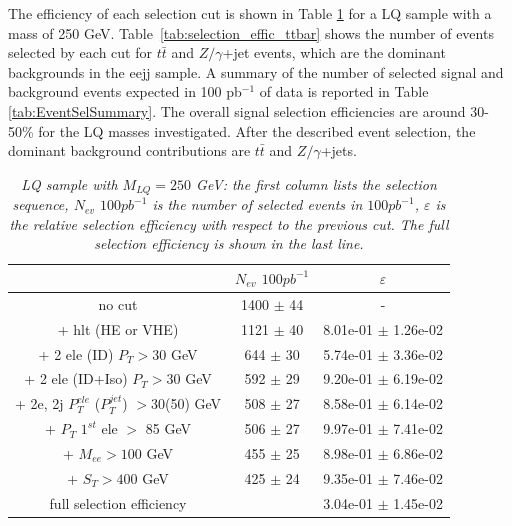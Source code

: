 \documentclass{cmspaper}
\begin{document}
\begin{linenumbers}
The efficiency of each selection cut is shown in Table \ref{tab:selection_effic_250} 
for a LQ sample with a mass of 250 GeV.  
Table~\ref{tab:selection_effic_ttbar} shows the number of events selected by each cut 
for $t\bar{t}$ and $Z/\gamma$+jet events, which are the dominant backgrounds in the eejj sample. 
A summary of the number of selected signal and background events expected in 100 pb$^{-1}$ of data 
is reported in Table \ref{tab:EventSelSummary}. 
The overall signal selection efficiencies 
are around 30-50\% for the LQ masses investigated. 
After the described event selection, the dominant background 
contributions are $t\bar{t}$ and $Z/\gamma$+jets. 

\begin{table}[htbp]
\begin{center}
\begin{tabular}{|c|c|c|}
\hline
\hline
 & $N_{ev}$ $100pb^{-1}$ & $\varepsilon$ \\
\hline
\hline

no cut &1400 $\pm$ 44& - \\
+ hlt (HE or VHE) &1121 $\pm$ 40 & 8.01e-01 $\pm$ 1.26e-02\\
+ 2 ele (ID) $P_{T} >30$ GeV &644 $\pm$ 30 & 5.74e-01 $\pm$ 3.36e-02\\
+ 2 ele (ID+Iso) $P_{T} >30$ GeV &592 $\pm$ 29 & 9.20e-01 $\pm$ 6.19e-02\\
+ 2e, 2j $P_{T}^{ele}$ ($P_{T}^{jet}$) $>$30(50) GeV &508 $\pm$ 27& 8.58e-01 $\pm$ 6.14e-02\\
+ $P_{T}$ $1^{st}$ ele $>$ 85 GeV &506 $\pm$ 27& 9.97e-01 $\pm$ 7.41e-02\\
+ $M_{ee} >100$ GeV& 455 $\pm$ 25& 8.98e-01 $\pm$ 6.86e-02\\
+ $S_{T} >400$ GeV &425 $\pm$ 24& 9.35e-01 $\pm$ 7.46e-02\\
\hline

full selection efficiency& & 3.04e-01 $\pm$ 1.45e-02\\
\hline
\end{tabular}
\end{center}
\caption{\small \sl LQ sample with $M_{LQ}=250$ GeV: the first column lists the selection sequence, $N_{ev}$ $100pb^{-1}$ is the number of selected events in $100pb^{-1}$, $\varepsilon$ is the relative selection efficiency with respect to the previous cut. The full selection efficiency is shown in the last line.}
\label{tab:selection_effic_250}
\end{table}




\end{linenumbers}
\end{document}
